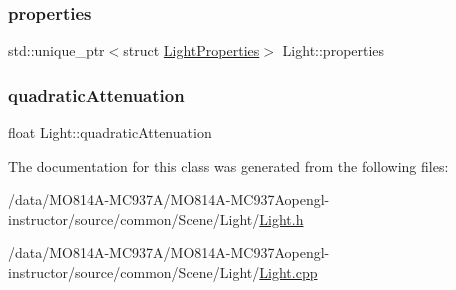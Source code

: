 \hypertarget{class_light_a74eba4cac1cc27e741230fbda32fceef}{}\label{class_light_a74eba4cac1cc27e741230fbda32fceef}
\subsubsection{\texorpdfstring{properties}{properties}}
{\footnotesize\ttfamily std\+::unique\+\_\+ptr$<$struct \hyperlink{struct_light_properties}{Light\+Properties}$>$ Light\+::properties\hspace{0.3cm}{\ttfamily [private]}}

\hypertarget{class_light_a0f24dde11cbbd12d0f0309e189f3640c}{}\label{class_light_a0f24dde11cbbd12d0f0309e189f3640c}
\subsubsection{\texorpdfstring{quadratic\+Attenuation}{quadraticAttenuation}}
{\footnotesize\ttfamily float Light\+::quadratic\+Attenuation\hspace{0.3cm}{\ttfamily [private]}}



The documentation for this class was generated from the following files\+:\begin{DoxyCompactItemize}
\item
/data/MO814A-MC937A/MO814A-MC937Aopengl-\/instructor/source/common/\+Scene/\+Light/\hyperlink{_light_8h}{Light.\+h}\item
/data/MO814A-MC937A/MO814A-MC937Aopengl-\/instructor/source/common/\+Scene/\+Light/\hyperlink{_light_8cpp}{Light.\+cpp}\end{DoxyCompactItemize}
